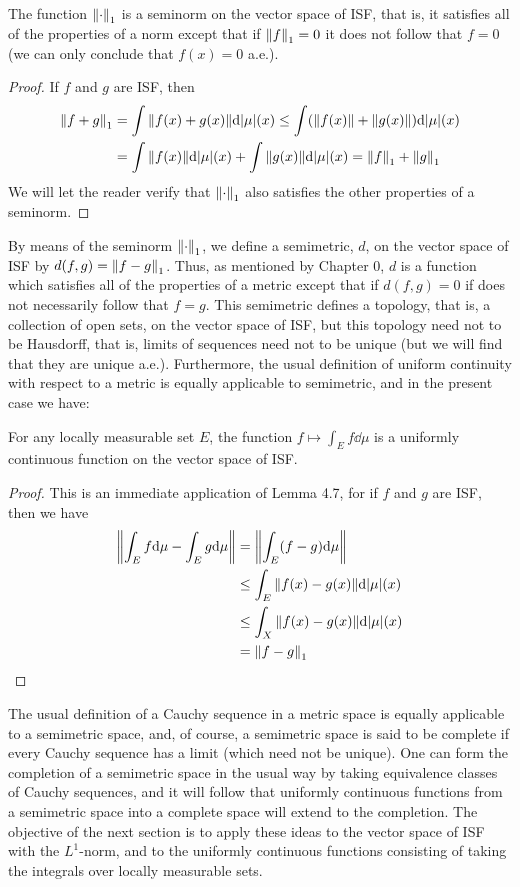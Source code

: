 \begin{lemma}
The function $\norm{\cdot}_1$ is a seminorm on the vector space of ISF, that is, it satisfies all of the properties of a norm except that if $\norm{f}_1=0$ it does not follow that $f=0$ (we can only conclude that $f(x)=0$ a.e.).
\end{lemma}
\begin{proof}
If $f$ and $g$ are ISF, then
\begin{align*}
    \norm{f+g}_1&=\int\norm{f(x)+g(x)}\dd|\mu|(x)\leq\int(\norm{f(x)}+\norm{g(x)})\dd|\mu|(x)\\
    &=\int\norm{f(x)}\dd|\mu|(x)+\int\norm{g(x)}\dd|\mu|(x)=\norm{f}_1+\norm{g}_1
\end{align*}
We will let the reader verify that $\norm{\cdot}_1$ also satisfies the other properties of a seminorm.
\end{proof}

By means of the seminorm $\norm{\cdot}_1$, we define a semimetric, $d$, on the vector space of ISF by $d(f,g)=\norm{f-g}_1$. Thus, as mentioned by Chapter 0, $d$ is a function which satisfies all of the properties of a metric except that if $d(f,g)=0$ if does not necessarily follow that $f=g$. This semimetric defines a topology, that is, a collection of open sets, on the vector space of ISF, but this topology need not to be Hausdorff, that is, limits of sequences need not to be unique (but we will find that they are unique a.e.). Furthermore, the usual definition of uniform continuity with respect to a metric is equally applicable to semimetric, and in the present case we have:

\begin{lemma}
For any locally measurable set $E$, the function $f\mapsto\int_Ef\dd\mu$ is a uniformly continuous function on the vector space of ISF.
\end{lemma}

\begin{proof}
This is an immediate application of Lemma 4.7, for if $f$ and $g$ are ISF, then we have
\begin{align*}
    \norm{\int_Ef\dd\mu-\int_Eg\dd\mu}&=\norm{\int_E(f-g)\dd\mu}\\
    &\leq\int_E\norm{f(x)-g(x)}\dd|\mu|(x)\\
    &\leq\int_X\norm{f(x)-g(x)}\dd|\mu|(x)\\
    &=\norm{f-g}_1
\end{align*}
\end{proof}

The usual definition of a Cauchy sequence in a metric space is equally applicable to a semimetric space, and, of course, a semimetric space is said to be complete if every Cauchy sequence has a limit (which need not be unique). One can form the completion of a semimetric space in the usual way by taking equivalence classes of Cauchy sequences, and it will follow that uniformly continuous functions from a semimetric space into a complete space will extend to the completion. The objective of the next section is to apply these ideas to the vector space of ISF with the $L^1$-norm, and to the uniformly continuous functions consisting of taking the integrals over locally measurable sets.

